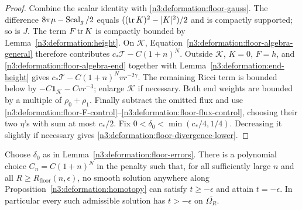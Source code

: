 \begin{proof}
Combine the scalar identity with \eqref{n3:deformation:floor-gauss}.
The difference $8\pi\mu-\operatorname{Scal}_g/2$ equals
$((\operatorname{tr} K)^2-|K|^2)/2$ and is compactly supported; so is $J$.
The term $F\operatorname{tr} K$ is compactly bounded by Lemma~\ref{n3:deformation:height}.
On $\mathcal K$, Equation~\eqref{n3:deformation:floor-algebra-general}
therefore contributes $c_*\mathcal T-C(1+n)^N$.
Outside $\mathcal K$, $K=0$, $F=h$, and
\eqref{n3:deformation:floor-algebra-end} together with
Lemma~\ref{n3:deformation:end-height} gives
$c_*\mathcal T-C(1+n)^Nv r^{-2\gamma}$.
The remaining Ricci term is bounded below by
$-C\mathbf1_{\mathcal K}-Cv r^{-3}$; enlarge $\mathcal K$ if necessary.
Both end weights are bounded by a multiple of $\rho_0+\rho_1$.
Finally subtract the omitted flux and use
\eqref{n3:deformation:floor-F-control}--\eqref{n3:deformation:floor-flux-control},
choosing their two $\eta$'s with sum at most $c_*/2$.
Fix $0<\delta_0<\min(c_*/4,1/4)$. Decreasing it slightly if necessary
gives \eqref{n3:deformation:floor-divergence-lower}.
\end{proof}

\begin{proposition}\label{n3:deformation:floor}
Choose $\delta_0$ as in Lemma~\ref{n3:deformation:floor-errors}.
There is a polynomial choice $C_n=C(1+n)^N$ in the penalty such that,
for all sufficiently large $n$ and all
$R\ge R_{\mathrm{floor}}(n,\epsilon)$, no smooth solution anywhere along
Proposition~\ref{n3:deformation:homotopy} can satisfy $t\ge-\epsilon$
and attain $t=-\epsilon$.
In particular every such admissible solution has $t>-\epsilon$ on
$\overline{\Omega_R}$.
\end{proposition}

